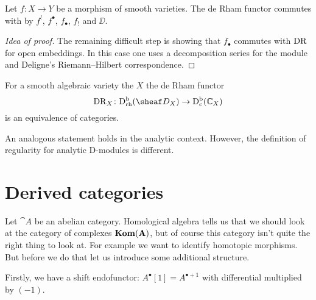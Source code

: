 \documentclass[number-in-sections,a4paper]{notes}
\begin{document}
\begin{Theorem}
    Let $f\colon X \to Y$ be a morphism of smooth varieties.
    The de Rham functor commutes with by $f^!$, $f^\bullet$, $f_\bullet$, $f_!$ and $\DD$.
\end{Theorem}

\begin{proof}[Idea of proof]
    The remaining difficult step is showing that $f_\bullet$ commutes with $\operatorname{DR}$ for open embeddings.
    In this case one uses a decomposition series for the module and Deligne's Riemann--Hilbert correspondence.
\end{proof}

\begin{Theorem}
    For a smooth algebraic variety the $X$ the de Rham functor
    \[
        \DR_X\colon \catDbDModrh{X} \to \catDbConstr{X}
    \]
    is an equivalence of categories.
\end{Theorem}

\begin{Remark}
    An analogous statement holds in the analytic context.
    However, the definition of regularity for analytic D-modules is different.
\end{Remark}


\iffalse

\begin{itemize}
    \item Outline of proof in the algebraic setting
    \item Perverse sheaves
\end{itemize}

\fi
\appendix

\section{Derived categories}
Let $\cat A$ be an abelian category.
Homological algebra tells us that we should look at the category of complexes $\mathbf{Kom}(\mathbf A)$, but of course this category isn't quite the right thing to look at.
For example we want to identify homotopic morphisms.
But before we do that let us introduce some additional structure.

Firstly, we have a shift endofunctor: $A^\bullet[1] = A^{\bullet + 1}$ with differential multiplied by $(-1)$.
\end{document}
